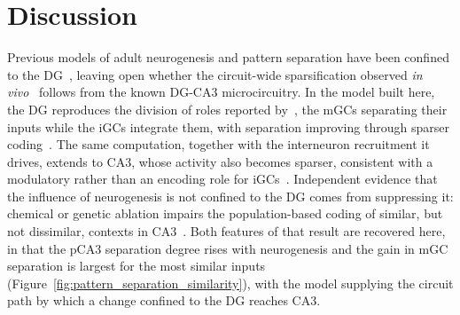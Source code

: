 \chapter{Discussion}\label{cap:discussion}

Previous models of adult neurogenesis and pattern separation have been confined to the DG~\parencite{chavlisDendrites2017,
kimEffect2024, yangDynamic2025}, leaving open whether the circuit-wide sparsification observed \textit{in
vivo}~\parencite{mchughAdultborn2022} follows from the known DG-CA3 microcircuitry. In the model built here, the DG reproduces the
division of roles reported by~\textcite{kimEffect2024}, the mGCs separating their inputs while the iGCs integrate them, with
separation improving through sparser coding~\parencite{chavlisDendrites2017}. The same computation, together with the interneuron
recruitment it drives, extends to CA3, whose activity also becomes sparser, consistent with a modulatory rather than an encoding
role for iGCs~\parencite{mchughAdultborn2022, folszAdultborn2023}. Independent evidence that the influence of neurogenesis is not
confined to the DG comes from suppressing it: chemical or genetic ablation impairs the population-based coding of similar, but not
dissimilar, contexts in CA3~\parencite{niiboriSuppression2012}. Both features of that result are recovered here, in that the pCA3
separation degree rises with neurogenesis and the gain in mGC separation is largest for the most similar inputs
(Figure~\ref{fig:pattern_separation_similarity}), with the model supplying the circuit path by which a change confined to the DG
reaches CA3.

